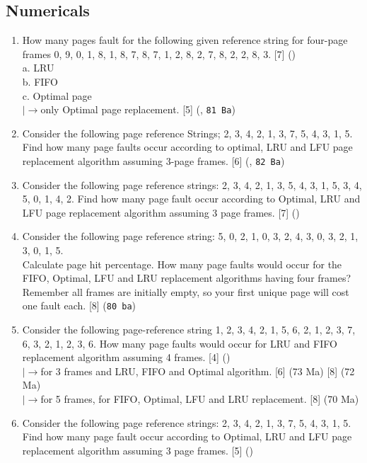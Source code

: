 \documentclass[12pt]{article}
\newcommand{\lb}{\\$\left|\rightarrow\right.$}
\begin{document}
	\subsection{Numericals}
		\begin{enumerate}
			\item How many pages fault for the following given reference string for four-page frames 0, 9, 0, 1, 8, 1, 8, 7, 8, 7, 1, 2, 8, 2, 7, 8, 2, 2, 8, 3. \hfill [7] ()\\
			a. LRU\\
			b. FIFO\\
			c. Optimal page
			\lb only Optimal page replacement. \hfill [5] (, \texttt{81 Ba})

			\item Consider the following page reference Strings; 2, 3, 4, 2, 1, 3, 7, 5, 4, 3, 1, 5. Find how many page faults occur according to optimal, LRU and LFU page replacement algorithm assuming 3-page frames. \hfill [6] (, \texttt{82 Ba})
			
			\item Consider the following page reference strings: 2, 3, 4, 2, 1, 3, 5, 4, 3, 1, 5, 3, 4, 5, 0, 1, 4, 2. Find how many page fault occur according to Optimal, LRU and LFU page replacement algorithm assuming 3 page frames. \hfill [7] ()

			\item Consider the following page reference string: 5, 0, 2, 1, 0, 3, 2, 4, 3, 0, 3, 2, 1, 3, 0, 1, 5.\\
			Calculate page hit percentage. How many page faults would occur for the FIFO, Optimal, LFU and LRU replacement algorithms having four frames? Remember all frames are initially empty, so your first unique page will cost one fault each. \hfill [8] (\texttt{80 ba})

			\item Consider the following page-reference string 1, 2, 3, 4, 2, 1, 5, 6, 2, 1, 2, 3, 7, 6, 3, 2, 1, 2, 3, 6. How many page faults would occur for LRU and FIFO replacement algorithm assuming 4 frames. \hfill [4] ()
			\lb for 3 frames and LRU, FIFO and Optimal algorithm. \hfill [6] (73 Ma) [8] (72 Ma)
			\lb for 5 frames, for FIFO, Optimal, LFU and LRU replacement. \hfill [8] (70 Ma)

			\item Consider the following page reference strings: 2, 3, 4, 2, 1, 3, 7, 5, 4, 3, 1, 5. Find how many page fault occur according to Optimal, LRU and LFU page replacement algorithm assuming 3 page frames. \hfill [5] ()


\end{enumerate}
\end{document}
